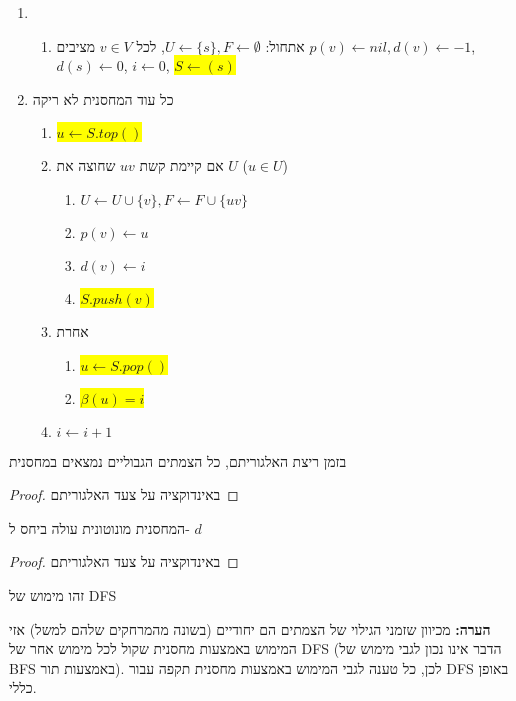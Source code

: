 \begin{enumerate}
	\item
\begin{enumerate}
\item
אתחול:
$U \leftarrow \{s\}, F \leftarrow \emptyset$, 
לכל 
$v \in V$
מציבים
$p(v) \leftarrow nil, d(v) \leftarrow -1$,
$d(s) \leftarrow 0$,
$i \leftarrow 0$,
\colorbox{yellow}{$S \leftarrow (s)$}
\end{enumerate}

\item
כל עוד המחסנית לא ריקה
\begin{enumerate}
	\item
	\colorbox{yellow}{$u \leftarrow S.top()$}
	\item 
	אם קיימת קשת 
	$uv$
	שחוצה את $U$ 
	($u \in U$)
		\begin{enumerate}
		\item
		$U \leftarrow U \cup \{v\}, F \leftarrow F \cup \{uv\}$
		\item
		$p(v) \leftarrow u$
		\item
		$d(v) \leftarrow i$
		\item
		\colorbox{yellow}{$S.push(v)$}
		\end{enumerate}
	\item
	אחרת 
	\begin{enumerate}
		\item 
		\colorbox{yellow}{$u \leftarrow S.pop()$}
		\item 
		\colorbox{yellow}{$\beta(u) = i$}
	\end{enumerate}
	\item
	$i \leftarrow i + 1$
	\end{enumerate}
\end{enumerate}

\begin{claim}
בזמן ריצת האלגוריתם, כל הצמתים הגבוליים נמצאים במחסנית
\end{claim}
\begin{proof}
באינדוקציה על צעד האלגוריתם
\end{proof}
\begin{claim}
המחסנית מונוטונית עולה ביחס ל-%
$d$
\end{claim}
\begin{proof}
באינדוקציה על צעד האלגוריתם
\end{proof}

\begin{corollary}
זהו מימוש של DFS
\end{corollary}

\textbf{הערה:}
מכיוון שזמני הגילוי של הצמתים הם יחודיים (בשונה מהמרחקים שלהם למשל) אזי המימוש באמצעות מחסנית
שקול לכל מימוש אחר של DFS (הדבר אינו נכון לגבי מימוש של BFS באמצעות תור).
לכן, כל טענה לגבי המימוש באמצעות מחסנית תקפה עבור DFS באופן כללי.
